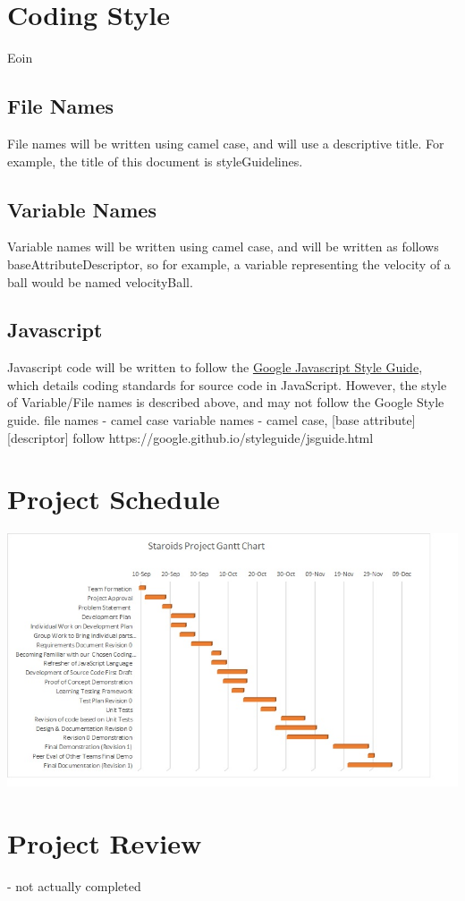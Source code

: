 \documentclass{article}
\begin{document}
\section{Coding Style}
Eoin
\subsection{File Names}
File names will be written using camel case, and will use a descriptive title. For example, the title of this document is styleGuidelines.
\subsection{Variable Names}
Variable names will be written using camel case, and will be written as follows baseAttributeDescriptor, so for example, a variable representing the velocity of a ball would be named velocityBall.
\subsection{Javascript}
Javascript code will be written to follow the \href{https://google.github.io/styleguide/jsguide.html}{Google Javascript Style Guide}, which details coding standards for source code in JavaScript. However, the style of Variable/File names is described above, and may not follow the Google Style guide.
file names - camel case
variable names - camel case, [base attribute][descriptor]
follow https://google.github.io/styleguide/jsguide.html

\section{Project Schedule}
\begin{center}
\includegraphics[scale=1]{gantt.jpg}
\end{center}


\section{Project Review}

- not actually completed
\end{document}
